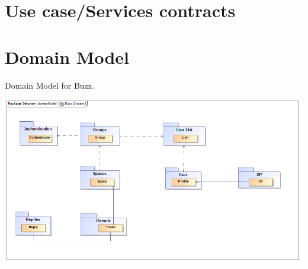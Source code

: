 \documentclass[pdftex,10pt,a4paper]{report}
\begin{document}
	\section{Use case/Services contracts}

\newpage

\newpage

\newpage

\newpage

\newpage

\newpage

\newpage

\newpage

\newpage

\newpage

\newpage

\newpage

\section{Domain Model}
	\begin{description}
		\item[Domain Model for Buzz.] 
	\end{description}
	\includegraphics[width=\textwidth]{domainModel}

\newpage
\end{document}
